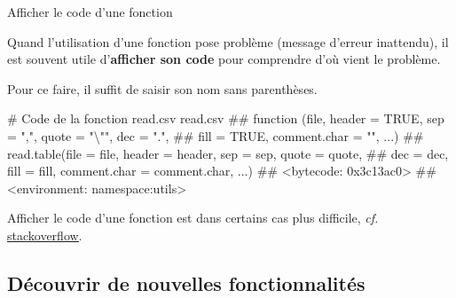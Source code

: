 \documentclass[12pt,handout,ignorenonframetext,]{beamer}
\newenvironment{Shaded}{}{}
\newcommand{\CommentTok}[1]{\textcolor[rgb]{0.00,0.50,0.00}{{#1}}}
\newcommand{\NormalTok}[1]{{#1}}
\renewenvironment{Shaded}{\begin{snugshade}}{\end{snugshade}}
\begin{document}
\begin{frame}[fragile]{Afficher le code d'une fonction}

Quand l'utilisation d'une fonction pose problème (message d'erreur
inattendu), il est souvent utile d'\textbf{afficher son code} pour
comprendre d'où vient le problème.

\pause Pour ce faire, il suffit de saisir son nom sans parenthèses.

\footnotesize

\begin{Shaded}
\begin{Highlighting}[]
\CommentTok{# Code de la fonction read.csv}
\NormalTok{read.csv}
  \NormalTok{## function (file, header = TRUE, sep = ",", quote = "\textbackslash{}"", dec = ".", }
  \NormalTok{##     fill = TRUE, comment.char = "", ...) }
  \NormalTok{## read.table(file = file, header = header, sep = sep, quote = quote, }
  \NormalTok{##     dec = dec, fill = fill, comment.char = comment.char, ...)}
  \NormalTok{## <bytecode: 0x3c13ac0>}
  \NormalTok{## <environment: namespace:utils>}
\end{Highlighting}
\end{Shaded}

\pause \normalsize
Afficher le code d'une fonction est dans certains cas plus difficile,
\emph{cf.}
\href{http://stackoverflow.com/questions/19226816/how-can-i-view-the-source-code-for-a-function}{\underline{stackoverflow}}.

\end{frame}

\subsection{Découvrir de nouvelles
fonctionnalités}\label{decouvrir-de-nouvelles-fonctionnalites}
\end{document}
